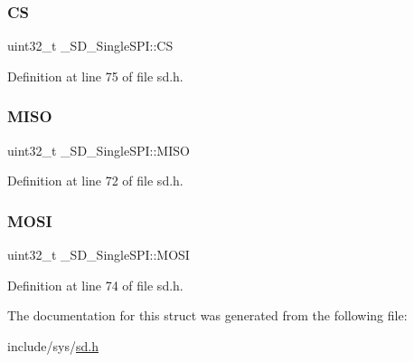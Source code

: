 \mbox{\label{struct__SD__SingleSPI_aa39888dd22c89ce4fb762fe66be4b7ba}} 
\subsubsection{\texorpdfstring{CS}{CS}}
{\footnotesize\ttfamily uint32\+\_\+t \+\_\+\+S\+D\+\_\+\+Single\+S\+P\+I\+::\+CS}



Definition at line 75 of file sd.\+h.

\mbox{\label{struct__SD__SingleSPI_a9cbb5894e13ae933db7245887cf65e09}} 
\subsubsection{\texorpdfstring{MISO}{MISO}}
{\footnotesize\ttfamily uint32\+\_\+t \+\_\+\+S\+D\+\_\+\+Single\+S\+P\+I\+::\+M\+I\+SO}



Definition at line 72 of file sd.\+h.

\mbox{\label{struct__SD__SingleSPI_a734dc6425b932e98f059295c613b2f44}} 
\subsubsection{\texorpdfstring{MOSI}{MOSI}}
{\footnotesize\ttfamily uint32\+\_\+t \+\_\+\+S\+D\+\_\+\+Single\+S\+P\+I\+::\+M\+O\+SI}



Definition at line 74 of file sd.\+h.



The documentation for this struct was generated from the following file\+:\begin{DoxyCompactItemize}
\item 
include/sys/\mbox{\hyperlink{sd_8h}{sd.\+h}}\end{DoxyCompactItemize}
